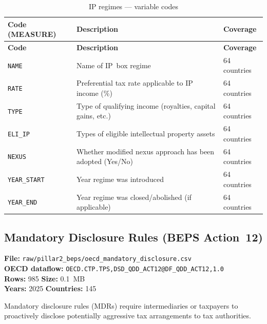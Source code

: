 \documentclass[11pt,a4paper]{article}
\begin{document}
\begin{longtable}{L{2.8cm} L{7.0cm} C{2.5cm}}
    \caption{IP regimes --- variable codes}
    \label{tab:ip_regimes}\\
    \toprule
    \textbf{Code (MEASURE)} & \textbf{Description} & \textbf{Coverage} \\
    \midrule
    \endfirsthead
    \toprule
    \textbf{Code} & \textbf{Description} & \textbf{Coverage} \\
    \midrule
    \endhead
    \bottomrule
    \endlastfoot
    \texttt{NAME}         & Name of IP~box regime & 64 countries \\
    \texttt{RATE}         & Preferential tax rate applicable to IP income (\%) & 64 countries \\
    \texttt{TYPE}         & Type of qualifying income (royalties, capital gains, etc.) & 64 countries \\
    \texttt{ELI\_IP}      & Types of eligible intellectual property assets & 64 countries \\
    \texttt{NEXUS}        & Whether modified nexus approach has been adopted (Yes/No) & 64 countries \\
    \texttt{YEAR\_START}  & Year regime was introduced & 64 countries \\
    \texttt{YEAR\_END}    & Year regime was closed/abolished (if applicable) & 64 countries \\
\end{longtable}

\subsection{Mandatory Disclosure Rules (BEPS Action~12)}
\label{subsec:beps_mdr}

\textbf{File:} \texttt{raw/pillar2\_beps/oecd\_mandatory\_disclosure.csv}\\
\textbf{OECD dataflow:} \texttt{OECD.CTP.TPS,DSD\_QDD\_ACT12@DF\_QDD\_ACT12,1.0}\\
\textbf{Rows:} 985 \quad \textbf{Size:} 0.1~MB\\
\textbf{Years:} 2025 \quad \textbf{Countries:} 145

Mandatory disclosure rules (MDRs) require intermediaries or taxpayers to
proactively disclose potentially aggressive tax arrangements to tax authorities.
\end{document}
